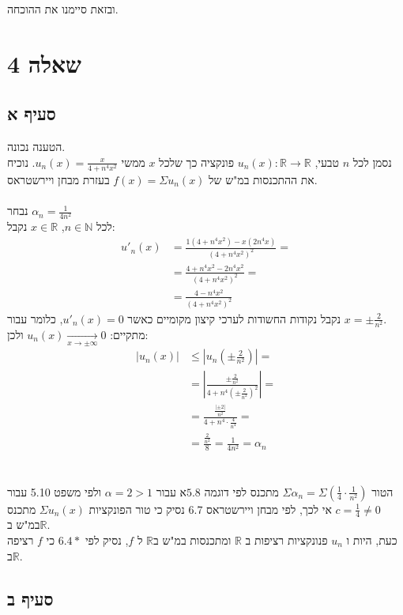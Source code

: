 \documentclass{article}
\def\reals{\mathbb{R}}
\def\naturals{\mathbb{N}}
\begin{document}
ובזאת סיימנו את ההוכחה.

\pagebreak

\section*{שאלה 4}

\subsection*{סעיף א}

הטענה נכונה. \\
נסמן לכל $n$ טבעי, $u_n(x): \reals\rightarrow\reals $ פונקציה כך שלכל $x$ ממשי $u_n(x)=\frac{x}{4+n^4x^2}$.
נוכיח את ההתכנסות במ"ש של $f(x)=\Sigma u_n(x)$ בעזרת מבחן ויירשטראס.\\\\
נבחר $\alpha_n=\frac{1}{4n^2}$ \\
לכל $n\in \naturals$, $x\in \reals$ נקבל:
\begin{align*}
    u'_n(x) & =\frac{1(4+n^4x^2)-x(2n^4x)}{(4+n^4x^2)^2}= \\
            & =\frac{4+n^4x^2-2n^4x^2}{(4+n^4x^2)^2}=     \\
            & =\frac{4-n^4x^2}{(4+n^4x^2)^2}
\end{align*}
נקבל נקודות החשודות לערכי קיצון מקומיים כאשר $u'_n(x)=0$, כלומר עבור $x=\pm \frac{2}{n^2}$. \\
מתקיים: $u_n(x)\xrightarrow[x\rightarrow \pm \infty]{}0$ ולכן:
\begin{align*}
    |u_n(x)| & \leq |u_n(\pm \frac{2}{n^2})|=                           \\
             & =|\frac{\pm \frac{2}{n^2}}{4+n^4(\pm \frac{2}{n^2})^2}|= \\
             & =\frac{\frac{|\pm 2|}{n^2}}{4+n^4\cdot \frac{4}{n^4}}=   \\
             & =\frac{\frac{2}{n^2}}{8}=\frac{1}{4n^2}=\alpha_n
\end{align*}
\\\\
הטור $\Sigma \alpha_n=\Sigma (\frac{1}{4} \cdot \frac{1}{n^2})$ מתכנס לפי דוגמה $5.8$א עבור $\alpha=2>1$ ולפי משפט 5.10 עבור $c=\frac{1}{4}\ne 0$
אי לכך, לפי מבחן ויירשטראס 6.7 נסיק כי טור הפונקציות $\Sigma u_n(x)$ מתכנס במ"ש ב$\reals$.\\
כעת, היות ו $u_n$ פנונקציות רציפות ב $\reals$ ומתכנסות במ"ש ב$\reals$ ל $f$, נסיק לפי $6.4*$ כי $f$ רציפה ב$\reals$.

\subsection*{סעיף ב}
\end{document}
